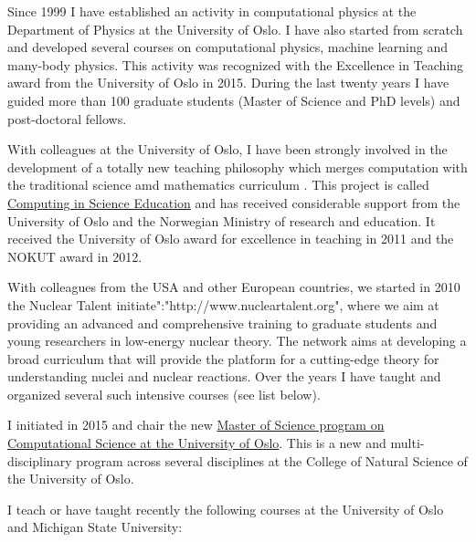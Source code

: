 \documentclass[%
oneside,                 %
final,                   %
10pt]{article}
\begin{document}
Since 1999 I have established an activity in computational physics at
the Department of Physics at the University of Oslo. I have also
started from scratch and developed several courses on computational
physics, machine learning and many-body physics. This activity was
recognized with the Excellence in Teaching award from the University
of Oslo in 2015. During the last twenty years I have guided more than
100 graduate students (Master of Science and PhD levels) and post-doctoral
fellows.

With colleagues at the University of Oslo, I have been strongly
involved in the development of a totally new teaching philosophy which
merges computation with the traditional science amd mathematics
curriculum . This project is called \href{{http://www.mn.uio.no/english/about/collaboration/cse/}}{Computing in Science
Education} and
has received considerable support from the University of Oslo and the
Norwegian Ministry of research and education.  It received the
University of Oslo award for excellence in teaching in 2011 and the
NOKUT award in 2012.

With colleagues from the USA and other European countries, we 
started in 2010 the Nuclear Talent initiate":"http://www.nucleartalent.org",
where we aim at providing an advanced and comprehensive training to
graduate students and young researchers in low-energy nuclear theory.
The network aims at developing a broad curriculum that will provide
the platform for a cutting-edge theory for understanding nuclei and
nuclear reactions. Over the years I have taught and organized several such intensive courses (see list below). 

I initiated in 2015 and chair the new \href{{http://www.uio.no/english/studies/programmes/computational-science-master/}}{Master of Science program on Computational Science at the University of Oslo}. This is a new and multi-disciplinary program across several disciplines at the College of Natural Science of the University of Oslo. 

I teach or have taught recently  the following courses at the University of Oslo and Michigan State University:
\end{document}
